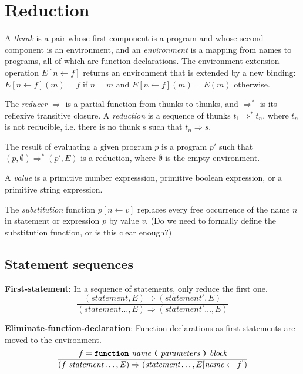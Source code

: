 \section*{Reduction}

A \emph{thunk} is a pair whose first component is a program
and whose
second component is an environment, and an 
\emph{environment} is a mapping from names to programs, all of which are
function declarations. The environment extension operation
$E [ n \leftarrow f]$ returns an environment that is extended by
a new binding: $E[n \leftarrow f](m) = f$ if $n = m$ and
$E[n \leftarrow f](m) = E(m)$ otherwise.

The \emph{reducer} $\Rightarrow$ is a partial function from thunks to thunks,
and $\Rightarrow^*$ is its reflexive transitive closure.
A \emph{reduction} is a sequence of thunks
$t_1 \Rightarrow^* t_n$, where $t_n$ is not reducible, i.e. there is no thunk
s such that $t_n \Rightarrow s$.

The result of evaluating a given program $p$ is a program $p'$
such that $(p, \emptyset) \Rightarrow^* (p', E)$ is a reduction,
where $\emptyset$ is the empty environment.

A \emph{value} is a primitive number expresssion, primitive boolean expression,
or a primitive string expression.

The \emph{substitution} function
$p [ n \leftarrow v ]$ replaces every free occurrence of the name $n$
in statement or expression $p$ by value $v$.
(Do we need to formally define the substitution function, or is this clear
enough?)

\subsection*{Statement sequences}


\textbf{First-statement}: In a sequence of statements, only reduce the first
one.
\[
\frac{
  (\textit{statement},E) \Rightarrow (\textit{statement}',E)
}{  
  (\textit{statement} \ldots, E)
  \Rightarrow 
  (\textit{statement}' \ldots, E)
}
\]

\vspace{10mm}

\textbf{Eliminate-function-declaration}: Function declarations as first
statements are moved to the environment.
\[
\frac{
             f = \textbf{\texttt{function}}\  \textit{name} \ 
                 \textbf{\texttt{(}}\  \textit{parameters}
                 \ \textbf{\texttt{)}}\ \textit{block}  
}{
( f\ \textit{statement} \ldots, E)
  \Rightarrow
  ( \textit{statement} \ldots, E[\textit{name} \leftarrow f])
}
\]

